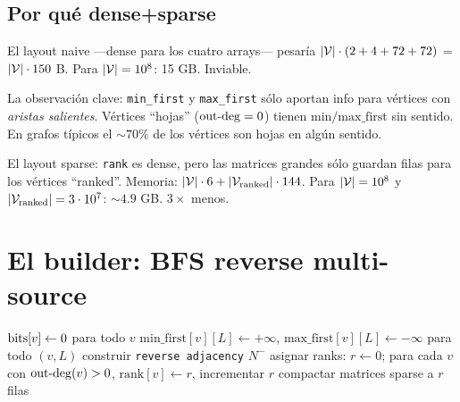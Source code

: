 \subsection{Por qué dense+sparse}

El layout naive ---dense para los cuatro arrays--- pesaría
\(|\mathcal{V}| \cdot (2 + 4 + 72 + 72)\) = \(|\mathcal{V}| \cdot 150\) B. Para
\(|\mathcal{V}| = 10^8\): 15 GB. Inviable.

La observación clave: \texttt{min\_first} y \texttt{max\_first}
sólo aportan info para vértices con \emph{aristas salientes}.
Vértices ``hojas'' (\(\mathrm{out\text{-}deg} = 0\)) tienen
\(\mathrm{min/max\_first}\) sin sentido. En grafos típicos el
\(\sim 70\%\) de los vértices son hojas en algún sentido.

El layout sparse: \texttt{rank} es dense, pero las matrices grandes
sólo guardan filas para los vértices ``ranked''. Memoria:
\(|\mathcal{V}| \cdot 6 + |\mathcal{V}_{\text{ranked}}| \cdot 144\). Para \(|\mathcal{V}| =
10^8\) y \(|\mathcal{V}_{\text{ranked}}| = 3 \cdot 10^7\): \(\sim 4.9\) GB.
\(3\times\) menos.

\section{El builder: BFS reverse multi-source}

\begin{algorithm}[H]
\caption{\texttt{KHopReach::build} (versión simplificada)}
\(\mathrm{bits}[v] \leftarrow 0\) para todo \(v\)\;
\(\mathrm{min\_first}[v][L] \leftarrow +\infty\), \(\mathrm{max\_first}[v][L] \leftarrow -\infty\) para todo \((v, L)\)\;
construir \texttt{reverse adjacency} \(N^{-}\)\;
\BlankLine
{}
asignar ranks: \(r \leftarrow 0\); para cada \(v\) con \(\mathrm{out\text{-}deg}(v) > 0\), \(\mathrm{rank}[v] \leftarrow r\), incrementar \(r\)\;
compactar matrices sparse a \(r\) filas\;
\Return\;
\end{algorithm}

